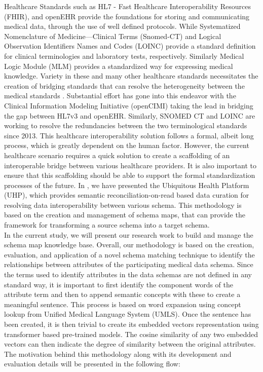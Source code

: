\documentclass{ieeeaccess}
\begin{document}
Healthcare Standards such as HL7 - Fast Healthcare Interoperability Resources (FHIR), and openEHR provide the foundations for storing and communicating medical data, through the use of well defined protocols. While Systematized Nomenclature of Medicine—Clinical Terms (Snomed-CT) \cite{snomedct_url} and Logical Observation Identifiers Names and Codes (LOINC) \cite{loinc} provide a standard definition for clinical terminologies and laboratory tests, respectively. Similarly Medical Logic Module (MLM) provides a standardized way for expressing medical knowledge. Variety in these and many other healthcare standards necessitates the creation of bridging standards that can resolve the heterogeneity between the medical standards \cite{mohammed2010ubiquitous}. Substantial effort has gone into this endeavor with the Clinical Information Modeling Initiative (openCIMI) \cite{CIMI2015} taking the lead in bridging the gap between HL7v3 and openEHR. Similarly, SNOMED CT and LOINC are working to resolve the redundancies between the two terminological standards since 2013. This healthcare interoperability solution follows a formal, albeit long process, which is greatly dependent on the human factor. However, the current healthcare scenario requires a quick solution to create a scaffolding of an interoperable bridge between various healthcare providers. It is also important to ensure that this scaffolding should be able to support the formal standardization processes of the future. In \cite{Satti2020}, we have presented the Ubiquitous Health Platform (UHP), which provides semantic reconciliation-on-read based data curation for resolving data interoperability between various schema. This methodology is based on the creation and management of schema maps, that can provide the framework for transforming a source schema into a target schema. 
\\
In the current study, we will present our research work to build and manage the schema map knowledge base. Overall, our methodology is based on the creation, evaluation, and application of a novel schema matching technique to identify the relationships between attributes of the participating medical data schema. Since the terms used to identify attributes in the data schemas are not defined in any standard way, it is important to first identify the component words of the attribute term and then to append semantic concepts with these to create a meaningful sentence. This process is based on word expansion using concept lookup from Unified Medical Language System (UMLS). Once the sentence has been created, it is then trivial to create its embedded vectors representation using transformer based pre-trained models. The cosine similarity of any two embedded vectors can then indicate the degree of similarity between the original attributes. The motivation behind this methodology along with its development and evaluation details will be presented in the following flow:
\end{document}
